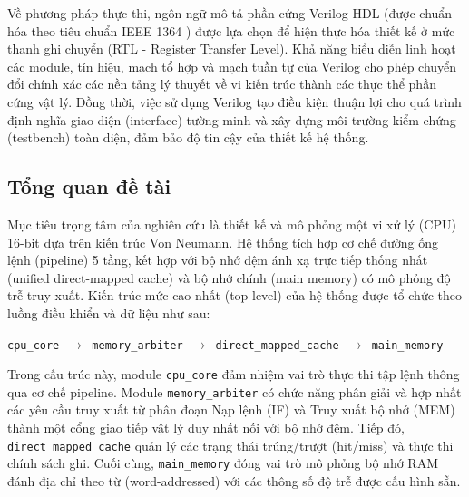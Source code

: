\documentclass[11pt,a4paper]{article}
\theoremstyle{definition}
\theoremstyle{remark}
\begin{document}
	Về phương pháp thực thi, ngôn ngữ mô tả phần cứng Verilog HDL (được chuẩn hóa theo tiêu chuẩn IEEE 1364 \cite{ieee1364}) được lựa chọn để hiện thực hóa thiết kế ở mức thanh ghi chuyển (RTL - Register Transfer Level). Khả năng biểu diễn linh hoạt các module, tín hiệu, mạch tổ hợp và mạch tuần tự của Verilog cho phép chuyển đổi chính xác các nền tảng lý thuyết về vi kiến trúc thành các thực thể phần cứng vật lý. Đồng thời, việc sử dụng Verilog tạo điều kiện thuận lợi cho quá trình định nghĩa giao diện (interface) tường minh và xây dựng môi trường kiểm chứng (testbench) toàn diện, đảm bảo độ tin cậy của thiết kế hệ thống.
	
	\subsection{Tổng quan đề tài}
	Mục tiêu trọng tâm của nghiên cứu là thiết kế và mô phỏng một vi xử lý (CPU) 16-bit dựa trên kiến trúc Von Neumann. Hệ thống tích hợp cơ chế đường ống lệnh (pipeline) 5 tầng, kết hợp với bộ nhớ đệm ánh xạ trực tiếp thống nhất (unified direct-mapped cache) và bộ nhớ chính (main memory) có mô phỏng độ trễ truy xuất. Kiến trúc mức cao nhất (top-level) của hệ thống được tổ chức theo luồng điều khiển và dữ liệu như sau:
	\begin{center}
		\texttt{cpu\_core $\rightarrow$ memory\_arbiter $\rightarrow$ direct\_mapped\_cache $\rightarrow$ main\_memory}
	\end{center}
	Trong cấu trúc này, module \texttt{cpu\_core} đảm nhiệm vai trò thực thi tập lệnh thông qua cơ chế pipeline. Module \texttt{memory\_arbiter} có chức năng phân giải và hợp nhất các yêu cầu truy xuất từ phân đoạn Nạp lệnh (IF) và Truy xuất bộ nhớ (MEM) thành một cổng giao tiếp vật lý duy nhất nối với bộ nhớ đệm. Tiếp đó, \texttt{direct\_mapped\_cache} quản lý các trạng thái trúng/trượt (hit/miss) và thực thi chính sách ghi. Cuối cùng, \texttt{main\_memory} đóng vai trò mô phỏng bộ nhớ RAM đánh địa chỉ theo từ (word-addressed) với các thông số độ trễ được cấu hình sẵn.
\end{document}
